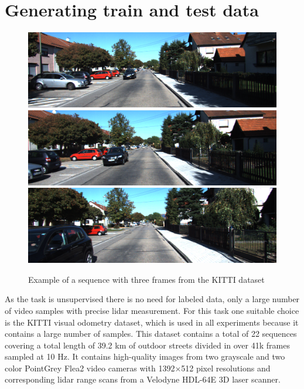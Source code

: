\section{Generating train and test data}
\begin{figure}[t]
\centering
\includegraphics[width=\textwidth]{images/img_first.png}
\includegraphics[width=\textwidth]{images/img_second.png}
\includegraphics[width=\textwidth]{images/img_third.png}
\caption{Example of a sequence with three frames from the KITTI dataset~\cite{geiger2012}}
\label{fig:frames}
\end{figure}

As the task is unsupervised there is no need for labeled data, only a large number of video samples with precise lidar measurement. For this task one suitable choice is the KITTI\cite{geiger2012} visual odometry dataset, which is used in all experiments because it contains a large number of samples. This dataset contains a total of 22 sequences covering a total length of 39.2 km of outdoor streets divided in over 41k frames sampled at 10 Hz. It contains high-quality images from two grayscale and two color PointGrey Flea2 video cameras with 1392×512 pixel resolutions and corresponding lidar range scans from a Velodyne HDL-64E 3D laser scanner.

